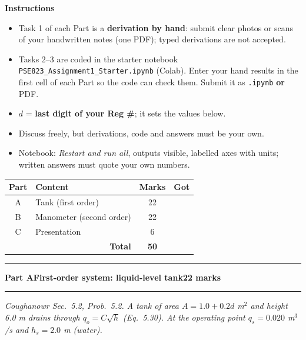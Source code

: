 \documentclass[10pt,a4paper]{article}
\newcommand{\code}[1]{\texttt{#1}}
\newcommand{\examsection}[3]{%
  \par\vspace{6pt}
  \noindent\rule{\linewidth}{1.4pt}\par\vspace{2pt}
  {\large\bfseries Part #1\quad #2}\hfill {\small\textbf{#3 marks}}\par
  \vspace{1pt}\noindent\rule{\linewidth}{0.4pt}\par\vspace{3pt}}
\newcommand{\sectionnote}[1]{{\small\itshape #1}\par\vspace{3pt}}
\begin{document}
\vspace{5pt}
\noindent
\begin{minipage}[t]{0.58\linewidth}\vspace{0pt}
  \begin{tcolorbox}[enhanced, colback=white, colframe=black, boxrule=0.5pt, arc=0pt,
                    left=5pt, right=5pt, top=2pt, bottom=2pt, fontupper=\footnotesize]
  \textbf{Instructions}
  \raggedright\begin{itemize}[leftmargin=1.1em, nosep, topsep=1pt]
    \item Task 1 of each Part is a \textbf{derivation by hand}: submit clear photos or scans of your handwritten notes (one PDF); typed derivations are not accepted.
    \item Tasks 2--3 are coded in the starter notebook \code{PSE823\_Assignment1\_Starter.ipynb} (Colab). Enter your hand results in the first cell of each Part so the code can check them. Submit it as \code{.ipynb} \textbf{or} PDF.
    \item $d$ = \textbf{last digit of your Reg \#}; it sets the values below.
    \item Discuss freely, but derivations, code and answers must be your own.
    \item Notebook: \emph{Restart and run all}, outputs visible, labelled axes with units; written answers must quote your own numbers.
  \end{itemize}
  \end{tcolorbox}
\end{minipage}\hfill
\begin{minipage}[t]{0.38\linewidth}\vspace{0pt}
  {\small\renewcommand{\arraystretch}{1.3}
  \begin{tabularx}{\linewidth}{|c|>{\raggedright\arraybackslash}X|c|c|}
    \hline
    \textbf{Part} & \textbf{Content} & \textbf{Marks} & \textbf{Got}\\ \hline
    A & Tank (first order) & 22 & \\ \hline
    B & Manometer (second order) & 22 & \\ \hline
    C & Presentation & 6 & \\ \hline
    \multicolumn{2}{|r|}{\textbf{Total}} & \textbf{50} & \\ \hline
  \end{tabularx}}
\end{minipage}

\examsection{A}{First-order system: liquid-level tank}{22}
\sectionnote{Coughanowr Sec.\ 5.2, Prob.\ 5.2. A tank of area $A=1.0+0.2d$ m$^2$ and height 6.0 m drains through $q_o=C\sqrt h$ (Eq.\ 5.30). At the operating point $q_s=0.020$ m$^3$/s and $h_s=2.0$ m (water).}
\end{document}
